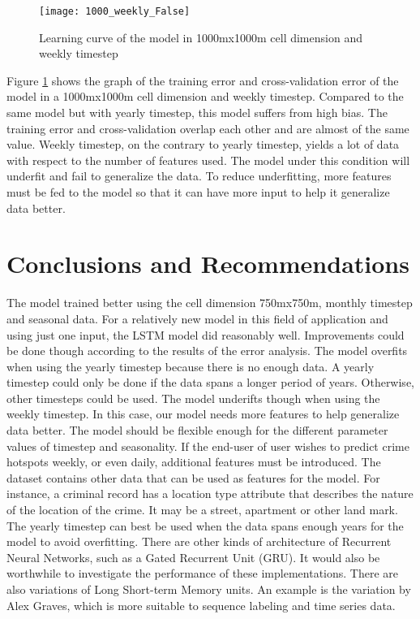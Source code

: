 \documentclass[a0]{sciposter}
\begin{document}
\begin{multicols}{2}
    \begin{figure}
      \centering
      \texttt{[image: 1000\_weekly\_False]}
      \caption{Learning curve of the model in 1000mx1000m cell dimension and weekly timestep}
      \label{fig:learning-curve2}
    \end{figure}

    Figure \ref{fig:learning-curve2} shows the graph of the training error and cross-validation error of the model in a 1000mx1000m cell dimension and weekly timestep. Compared to the same model but with yearly timestep, this model suffers from high bias. The training error and cross-validation overlap each other and are almost of the same value. Weekly timestep, on the contrary to yearly timestep, yields a lot of data with respect to the number of features used. The model under this condition will underfit and fail to generalize the data. To reduce underfitting, more features must be fed to the model so that it can have more input to help it generalize data better.

    \section {Conclusions and Recommendations}
    The model trained better using the cell dimension 750mx750m, monthly timestep and seasonal data. For a relatively new model in this field of application and using just one input, the LSTM model did reasonably well. Improvements could be done though according to the results of the error analysis. The model overfits when using the yearly timestep because there is no enough data. A yearly timestep could only be done if the data spans a longer period of years. Otherwise, other timesteps could be used. The model underifts though when using the weekly timestep. In this case, our model needs more features to help generalize data better. The model should be flexible enough for the different parameter values of timestep and seasonality. If the end-user of user wishes to predict crime hotspots weekly, or even daily, additional features must be introduced. The dataset contains other data that can be used as features for the model. For instance, a criminal record has a location type attribute that describes the nature of the location of the crime. It may be a street, apartment or other land mark. The yearly timestep can best be used when the data spans enough years for the model to avoid overfitting. There are other kinds of architecture of Recurrent Neural Networks, such as a Gated Recurrent Unit (GRU). It would also be worthwhile to investigate the performance of these implementations. There are also variations of Long Short-term Memory units. An example is the variation by Alex Graves, which is more suitable to sequence labeling and time series data.

    \end{multicols}
\end{document}
